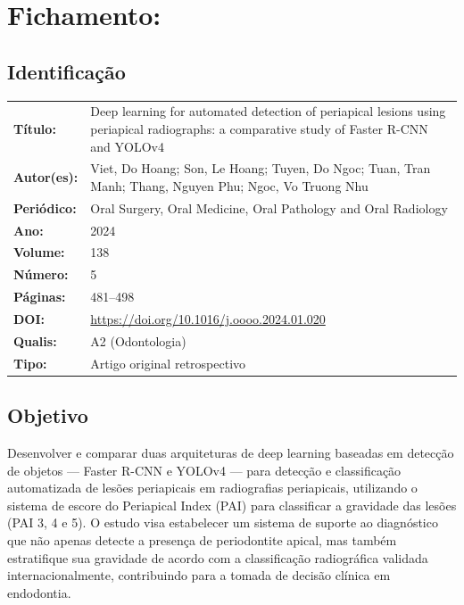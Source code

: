 \section{Fichamento: }

\subsection{Identificação}
\begin{tabular}{ll}
\textbf{Título:} & Deep learning for automated detection of periapical
lesions using periapical radiographs: a comparative study of Faster
R-CNN and YOLOv4 \\
\textbf{Autor(es):} & Viet, Do Hoang; Son, Le Hoang; Tuyen, Do Ngoc;
Tuan, Tran Manh; Thang, Nguyen Phu; Ngoc, Vo Truong Nhu \\
\textbf{Periódico:} & Oral Surgery, Oral Medicine, Oral Pathology and Oral Radiology \\
\textbf{Ano:} & 2024 \\
\textbf{Volume:} & 138 \\
\textbf{Número:} & 5 \\
\textbf{Páginas:} & 481--498 \\
\textbf{DOI:} & \url{https://doi.org/10.1016/j.oooo.2024.01.020} \\
\textbf{Qualis:} & A2 (Odontologia) \\
\textbf{Tipo:} & Artigo original retrospectivo \\
\end{tabular}

\subsection{Objetivo}
Desenvolver e comparar duas arquiteturas de deep learning baseadas em
detecção de objetos — Faster R-CNN e YOLOv4 — para detecção e
classificação automatizada de lesões periapicais em radiografias
periapicais, utilizando o sistema de escore do Periapical Index (PAI)
para classificar a gravidade das lesões (PAI 3, 4 e 5). O estudo
visa estabelecer um sistema de suporte ao diagnóstico que não apenas
detecte a presença de periodontite apical, mas também estratifique
sua gravidade de acordo com a classificação radiográfica validada
internacionalmente, contribuindo para a tomada de decisão clínica
em endodontia.


